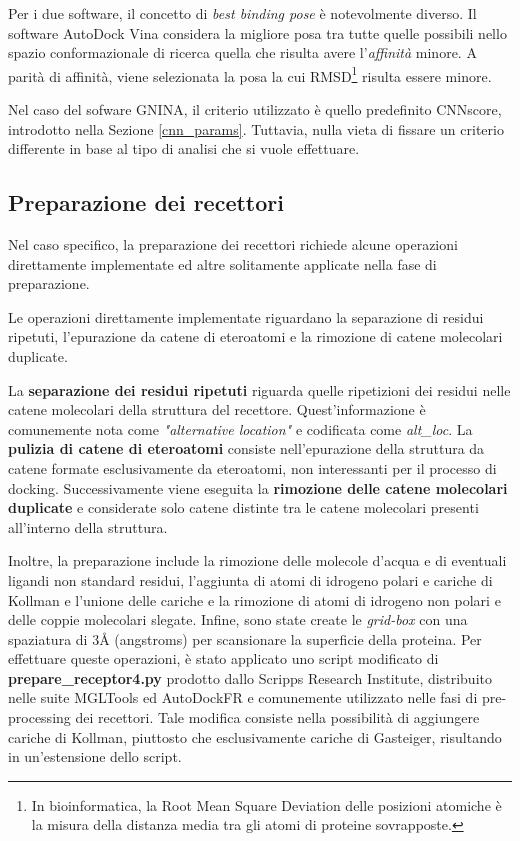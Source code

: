Per i due software, il concetto di \textit{best binding pose} è notevolmente diverso. 
Il software AutoDock Vina considera la migliore posa tra tutte quelle possibili nello spazio conformazionale di ricerca quella che risulta avere l'\textit{affinità} minore. A parità di affinità, viene selezionata la posa la cui RMSD\footnote{In bioinformatica, la Root Mean Square Deviation delle posizioni atomiche è la misura della distanza media tra gli atomi di proteine sovrapposte.} risulta essere minore.

Nel caso del sofware GNINA, il criterio utilizzato è quello predefinito CNNscore, introdotto nella Sezione \ref{cnn_params}. Tuttavia, nulla vieta di fissare un criterio differente in base al tipo di analisi che si vuole effettuare.


\subsection{Preparazione dei recettori}
Nel caso specifico, la preparazione dei recettori richiede alcune operazioni direttamente implementate ed altre solitamente applicate nella fase di preparazione.

Le operazioni direttamente implementate riguardano la separazione di residui ripetuti, l'epurazione da catene di eteroatomi e la rimozione di catene molecolari duplicate.

La \textbf{separazione dei residui ripetuti} riguarda quelle ripetizioni dei residui nelle catene molecolari della struttura del recettore. Quest'informazione è comunemente nota come \textit{"alternative location"} e codificata come \textit{alt\_loc}. La \textbf{pulizia di catene di eteroatomi} consiste nell'epurazione della struttura da catene formate esclusivamente da eteroatomi, non interessanti per il processo di docking. Successivamente viene eseguita la \textbf{rimozione delle catene molecolari duplicate} e considerate solo catene distinte tra le catene molecolari presenti all'interno della struttura.

Inoltre, la preparazione include la rimozione delle molecole d'acqua e di eventuali ligandi non standard residui, l'aggiunta di atomi di idrogeno polari e cariche di Kollman e l'unione delle cariche e la rimozione di atomi di idrogeno non polari e delle coppie molecolari slegate. Infine, sono state create le \textit{grid-box} con una spaziatura di 3Å (angstroms) per scansionare la superficie della proteina.
Per effettuare queste operazioni, è stato applicato uno script modificato di \textbf{prepare\_receptor4.py} prodotto dallo Scripps Research Institute, distribuito nelle suite MGLTools ed AutoDockFR e comunemente utilizzato nelle fasi di pre-processing dei recettori. Tale modifica consiste nella possibilità di aggiungere cariche di Kollman, piuttosto che esclusivamente cariche di Gasteiger, risultando in un'estensione dello script. 


